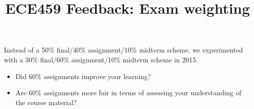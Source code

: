 \documentclass[12pt]{article}
\begin{document}
\title{ECE459 Feedback: Exam weighting}
\author{}
\renewcommand{\today}{}

\maketitle
\vspace*{-2em}
\thispagestyle{empty}

\noindent
Instead of a 50\% final/40\% assignment/10\% midterm scheme, we
experimented with a 30\% final/60\% assignment/10\% midterm scheme in
2015.

\begin{itemize}
\item Did 60\% assignments improve your learning?
\item Are 60\% assignments more fair in terms of assessing your understanding of the course material?
\end{itemize}
\end{document}
